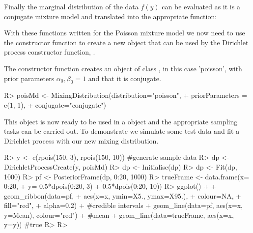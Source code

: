 \documentclass[nojss]{jss}
\begin{document}
Finally the marginal distribution of the data $f(y)$ can be evaluated as it is a conjugate mixture model and translated into the appropriate  function:

With these functions written for the Poisson mixture model we now need to use the  constructor function to create a new object that can be used by the Dirichlet process constructor function, .

The constructor function  creates an object of class , in this case 'poisson', with prior parameters $\alpha_0, \beta_0 = 1$ and that it is conjugate.
\begin{Schunk}
\begin{Sinput}
R> poisMd <- MixingDistribution(distribution="poisson",
+                               priorParameters = c(1, 1),
+                               conjugate="conjugate")
\end{Sinput}
\end{Schunk}
This object is now ready to be used in a  object and the appropriate sampling tasks can be carried out. To demonstrate we simulate some test data and fit a Dirichlet process with our new mixing distribution.
\newpage %
\begin{Schunk}
\begin{Sinput}
R> y <- c(rpois(150, 3), rpois(150, 10)) #generate sample data
R> dp <- DirichletProcessCreate(y, poisMd)
R> dp <- Initialise(dp)
R> dp <- Fit(dp, 1000)
R> pf <- PosteriorFrame(dp, 0:20, 1000)
R> trueFrame <- data.frame(x= 0:20,
+                          y= 0.5*dpois(0:20, 3) + 0.5*dpois(0:20, 10))
R> ggplot() +
+      geom_ribbon(data=pf,
+                  aes(x=x, ymin=X5., ymax=X95.),
+                  colour=NA,
+                  fill="red",
+                  alpha=0.2) + #credible intervals
+      geom_line(data=pf, aes(x=x, y=Mean), colour="red") + #mean
+      geom_line(data=trueFrame, aes(x=x, y=y)) #true
R> 
R> 
\end{Sinput}
\end{Schunk}
\end{document}
